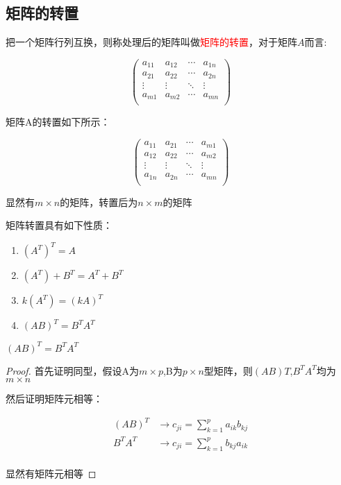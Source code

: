 \subsection{矩阵的转置}
\begin{definition}

把一个矩阵行列互换，则称处理后的矩阵叫做\textcolor{red}{矩阵的转置}，对于矩阵$A$而言:

$$
\begin{pmatrix}
	a_{11} &a_{12}&\cdots&a_{1n}\\
	a_{21}&a_{22}&\cdots&a_{2n}\\
	\vdots&\vdots&\ddots&\vdots\\
	a_{m1}&a_{m2}&\cdots&a_{mn}\\
\end{pmatrix}
$$

矩阵A的转置如下所示：

$$
\begin{pmatrix}
	a_{11} &a_{21}&\cdots&a_{m1}\\
	a_{12}&a_{22}&\cdots&a_{m2}\\
	\vdots&\vdots&\ddots&\vdots\\
	a_{1n}&a_{2n}&\cdots&a_{mn}\\
\end{pmatrix}
$$

显然有$m\times n$的矩阵，转置后为$n\times m$的矩阵
\end{definition}

矩阵转置具有如下性质：

\begin{theorem}
	\begin{enumerate}
		\item  $(A^T)^T=A$
		\item $(A^T)+B^T=A^T+B^T$
		\item $k(A^T)=(kA)^T$
		\item $(AB)^T=B^TA^T$
	\end{enumerate}
\end{theorem}

\begin{example}
	$(AB)^T=B^TA^T$

	\begin{proof}
		首先证明同型，假设A为$m\times p$,B为$p\times n$型矩阵，则$(AB)T$,$B^TA^T$均为$m\times n$

		然后证明矩阵元相等：

		$$
		\begin{aligned}
			(AB)^T&\rightarrow c_{ji}=\sum_{k=1}^p a_{ik}b_{kj}\\
			B^TA^T&\rightarrow c_{ji}=\sum_{k=1}^p b_{kj}a_{ik}\\
		\end{aligned}
		$$

		显然有矩阵元相等
	\end{proof}
\end{example}

